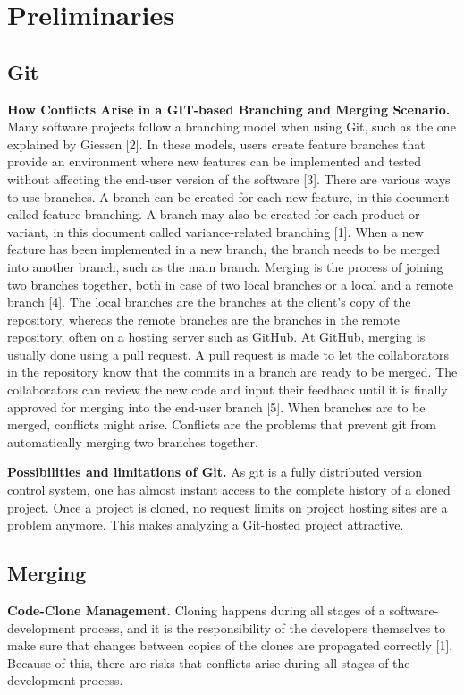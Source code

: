 \chapter{Preliminaries}

\section{Git}
\textbf{How Conflicts Arise in a GIT-based Branching and Merging Scenario.} Many software projects follow a branching model when using Git, such as the one explained by Giessen [2]. In these models, users create feature branches that provide an environment where new features can be implemented and tested without affecting the end-user version of the software [3]. There are various ways to use branches. A branch can be created for each new feature, in this document called feature-branching. A branch may also be created for each product or variant, in this document called variance-related branching [1]. When a new feature has been implemented in a new branch, the branch needs to be merged into another branch, such as the main branch. Merging is the process of joining two branches together, both in case of two local branches or a local and a remote branch [4]. The local branches are the branches at the client’s copy of the repository, whereas the remote branches are the branches in the remote repository, often on a hosting server such as GitHub. At GitHub, merging is usually done using a pull request. A pull request is made to let the collaborators in the repository know that the commits in a branch are ready to be merged. The collaborators can review the new code and input their feedback until it is finally approved for merging into the end-user branch [5]. When branches are to be merged, conflicts might arise. Conflicts are the problems that prevent git from automatically merging two branches together.

\textbf{Possibilities and limitations of Git.} As git is a fully distributed version control system, one has almost instant access to the complete history of a cloned project. Once a project is cloned, no request limits on project hosting sites are a problem anymore. This makes analyzing a Git-hosted project attractive.

\section{Merging}
\textbf{Code-Clone Management.} Cloning happens during all stages of a software-development process, and it is the responsibility of the developers themselves to make sure that changes between copies of the clones are propagated correctly [1]. Because of this, there are risks that conflicts arise during all stages of the development process.

